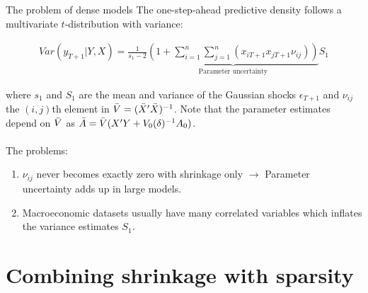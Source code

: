 \begin{frame}{The problem of dense models}
    The one-step-ahead predictive density follows a multivariate $t$-distribution with variance:
    
    \begin{align}
        Var(y_{T + 1}|Y,X) = \frac{1}{s_1 - 2} \underbrace{\left(1 + \sum_{i = 1}^{n} \sum_{j = 1}^{n} (x_{iT+1} x_{jT+1} \nu_{ij}) \right)}_{\text{Parameter uncertainty}} S_1
    \end{align}
    
    where $s_1$ and $S_1$ are the mean and variance of the Gaussian shocks $\epsilon_{T + 1}$ and $\nu_{ij}$ the $(i,j)$th element in $\Bar{V} = (\Bar{X}'\Bar{X})^{-1}$. Note that the parameter estimates depend on $\Bar{V}$ as $\Bar{A} = \Bar{V} (X'Y + V_0(\delta)^{-1} A_0)$.\\~\\
    
    The problems:
    \begin{enumerate}
        \item $\nu_{ij}$ never becomes exactly zero with shrinkage only $\rightarrow$ Parameter uncertainty adds up in large models.
        \item Macroeconomic datasets usually have many correlated variables which inflates the variance estimates $S_1$.
    \end{enumerate}
\end{frame}

\section{Combining shrinkage with sparsity}


